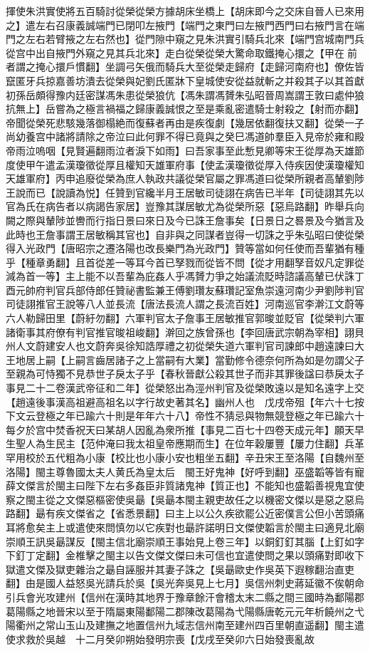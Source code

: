 揮使朱洪實使將五百騎討從榮從榮方據胡床坐橋上【胡床即今之交床自晉人已來用之】遣左右召康義誠端門已閉叩左掖門【端門之東門曰左掖門西門曰右掖門言在端門之左右若臂掖之左右然也】從門隙中窺之見朱洪實引騎兵北來【端門宫城南門兵從宫中出自掖門外窺之見其兵北來】走白從榮從榮大驚命取鐵掩心擐之【甲在前者謂之掩心擐戶慣翻】坐調弓矢俄而騎兵大至從榮走歸府【走歸河南府也】僚佐皆竄匿牙兵掠嘉善坊潰去從榮與妃劉氏匿牀下皇城使安從益就斬之并殺其子以其首獻初孫岳頗得豫内廷密謀馮朱患從榮狼伉【馮朱謂馮贇朱弘昭晉周嵩謂王敦曰處仲狼抗無上】岳嘗為之極言禍福之歸康義誠恨之至是乘亂密遣騎士射殺之【射而亦翻】帝聞從榮死悲駭幾落御榻絶而復蘇者再由是疾復劇【幾居依翻復扶又翻】從榮一子尚幼養宫中諸將請除之帝泣曰此何罪不得已竟與之癸巳馮道帥羣臣入見帝於雍和殿帝雨泣嗚咽【見賢遍翻雨泣者淚下如雨】曰吾家事至此慙見卿等宋王從厚為天雄節度使甲午遣孟漢瓊徵從厚且權知天雄軍府事【使孟漢瓊徵從厚入侍疾因使漢瓊權知天雄軍府】丙申追廢從榮為庶人執政共議從榮官屬之罪馮道曰從榮所親者高輦劉陟王說而已【說讀為悦】任贊到官纔半月王居敏司徒詡在病告已半年【司徒詡其先以官為氏在病告者以病謁告家居】豈豫其謀居敏尤為從榮所惡【惡烏路翻】昨舉兵向闕之際與輦陟並轡而行指日景曰來日及今已誅王詹事矣【日景日之晷景及今猶言及此時也王詹事謂王居敏稱其官也】自非與之同謀者豈得一切誅之乎朱弘昭曰使從榮得入光政門【唐昭宗之遷洛陽也改長樂門為光政門】贊等當如何任使而吾輩猶有種乎【種章勇翻】且首從差一等耳今首已孥戮而從皆不問【從才用翻孥音奴凡定罪從減為首一等】主上能不以吾輩為庇姦人乎馮贇力爭之始議流貶時諮議高輦已伏誅丁酉元帥府判官兵部侍郎任贊祕書監兼王傅劉瓚友蘇瓚記室魚崇遠河南少尹劉陟判官司徒詡推官王說等八人並長流【唐法長流人謂之長流百姓】河南巡官李澣江文蔚等六人勒歸田里【蔚紆勿翻】六軍判官太子詹事王居敏推官郭晙並貶官【從榮判六軍諸衛事其府僚有判官推官晙祖峻翻】澣回之族曾孫也【李回唐武宗朝為宰相】詡貝州人文蔚建安人也文蔚奔吳徐知誥厚禮之初從榮失道六軍判官司諫郎中趙遠諫曰大王地居上嗣【上嗣言齒居諸子之上當嗣有大業】當勤修令德奈何所為如是勿謂父子至親為可恃獨不見恭世子戾太子乎【春秋晉獻公殺其世子而非其罪後諡曰恭戾太子事見二十二卷漢武帝征和二年】從榮怒出為涇州判官及從榮敗遠以是知名遠字上交【趙遠後事漢高祖避高祖名以字行故史著其名】幽州人也　戊戌帝殂【年六十七按下文云登極之年已踰六十則是年年六十八】帝性不猜忌與物無競登極之年已踰六十每夕於宫中焚香祝天曰某胡人因亂為衆所推【事見二百七十四卷天成元年】願天早生聖人為生民主【范仲淹曰我太祖皇帝應期而生】在位年穀屢豐【屢力住翻】兵革罕用校於五代粗為小康【校比也小康小安也粗坐五翻】辛丑宋王至洛陽【自魏州至洛陽】閩主尊魯國太夫人黄氏為皇太后　閩王好鬼神【好呼到翻】巫盛韜等皆有寵薛文傑言於閩主曰陛下左右多姦臣非質諸鬼神【質正也】不能知也盛韜善視鬼宜使察之閩主從之文傑惡樞密使吳朂【吳朂本閩主親吏故任之以機密文傑以是惡之惡烏路翻】朂有疾文傑省之【省悉景翻】曰主上以公久疾欲罷公近密僕言公但小苦頭痛耳將愈矣主上或遣使來問慎勿以它疾對也朂許諾明日文傑使韜言於閩主曰適見北廟崇順王訊吳朂謀反【閩主信北廟崇順王事始見上卷三年】以銅釘釘其腦【上釘如字下釘丁定翻】金椎擊之閩主以告文傑文傑曰未可信也宜遣使問之果以頭痛對即收下獄遣文傑及獄吏雜治之朂自誣服并其妻子誅之【吳朂歐史作吳英下遐稼翻治直吏翻】由是國人益怒吳光請兵於吳【吳光奔吳見上七月】吳信州刺史蔣延徽不俟朝命引兵會光攻建州【信州在漢時其地界于豫章餘汗會稽太末二縣之間三國時為鄱陽郡葛陽縣之地晉宋以至于隋屬東陽鄱陽二郡陳改葛陽為弋陽縣唐乾元元年析饒州之弋陽衢州之常山玉山及建撫之地置信州九域志信州南至建州四百里朝直遥翻】閩主遣使求救於吳越　十二月癸卯朔始發明宗喪【戊戌至癸卯六日始發喪亂故